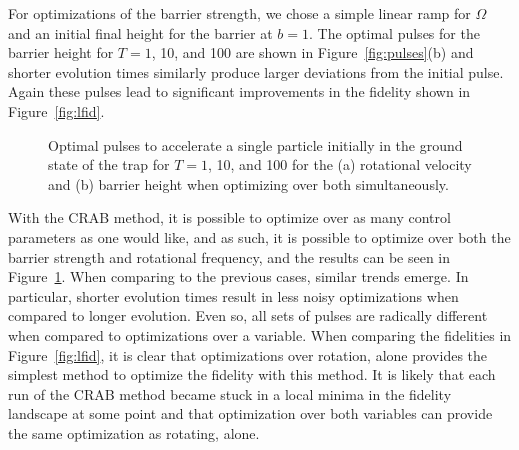 For optimizations of the barrier strength, we chose a simple linear ramp for $\Omega$ and an initial final height for the barrier at $b = 1$.
The optimal pulses for the barrier height for $T=1$, 10, and 100 are shown in Figure~\ref{fig:pulses}(b) and shorter evolution times similarly produce larger deviations from the initial pulse.
Again these pulses lead to significant improvements in the fidelity shown in Figure~\ref{fig:lfid}.

\begin{figure} 
\centering
 \caption{
 Optimal pulses to accelerate a single particle initially in the ground state of the trap
 for $T = 1$, 10, and 100 for the (a) rotational velocity and (b) barrier height when optimizing over both simultaneously. }
 \label{fig:pulses_pair}
\end{figure}

With the CRAB method, it is possible to optimize over as many control parameters as one would like, and as such, it is possible to optimize over both the barrier strength and rotational frequency, and the results can be seen in Figure~\ref{fig:pulses_pair}.
When comparing to the previous cases, similar trends emerge.
In particular, shorter evolution times result in less noisy optimizations when compared to longer evolution.
Even so, all sets of pulses are radically different when compared to optimizations over a variable.
When comparing the fidelities in Figure~\ref{fig:lfid}, it is clear that optimizations over rotation, alone provides the simplest method to optimize the fidelity with this method.
It is likely that each run of the CRAB method became stuck in a local minima in the fidelity landscape at some point and that optimization over both variables can provide the same optimization as rotating, alone.

